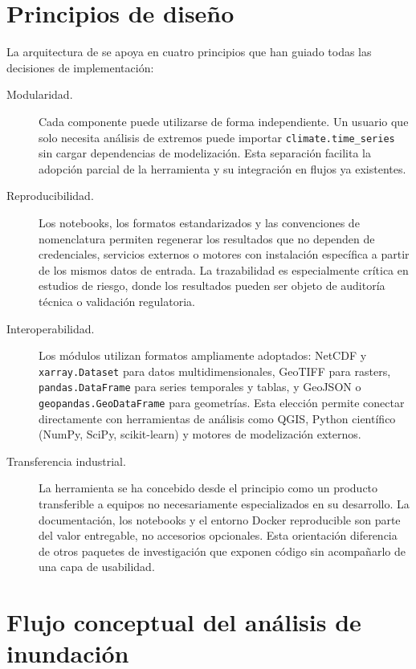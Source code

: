 \section{Principios de diseño}

La arquitectura de \hydra se apoya en cuatro principios que han guiado todas las decisiones de implementación:

\begin{description}
  \item[Modularidad.] Cada componente puede utilizarse de forma independiente. Un usuario que solo necesita análisis de extremos puede importar \texttt{climate.time\_series} sin cargar dependencias de modelización. Esta separación facilita la adopción parcial de la herramienta y su integración en flujos ya existentes.

  \item[Reproducibilidad.] Los notebooks, los formatos estandarizados y las convenciones de nomenclatura permiten regenerar los resultados que no dependen de credenciales, servicios externos o motores con instalación específica a partir de los mismos datos de entrada. La trazabilidad es especialmente crítica en estudios de riesgo, donde los resultados pueden ser objeto de auditoría técnica o validación regulatoria.

  \item[Interoperabilidad.] Los módulos utilizan formatos ampliamente adoptados: NetCDF y \texttt{xarray.Dataset} para datos multidimensionales, GeoTIFF para rasters, \texttt{pandas.DataFrame} para series temporales y tablas, y GeoJSON o \texttt{geopandas.GeoDataFrame} para geometrías. Esta elección permite conectar directamente con herramientas de análisis como QGIS, Python científico (NumPy, SciPy, scikit-learn) y motores de modelización externos.

  \item[Transferencia industrial.] La herramienta se ha concebido desde el principio como un producto transferible a equipos no necesariamente especializados en su desarrollo. La documentación, los notebooks y el entorno Docker reproducible son parte del valor entregable, no accesorios opcionales. Esta orientación diferencia \hydra de otros paquetes de investigación que exponen código sin acompañarlo de una capa de usabilidad.
\end{description}

\section{Flujo conceptual del análisis de inundación}
\label{sec:flujo_conceptual}

